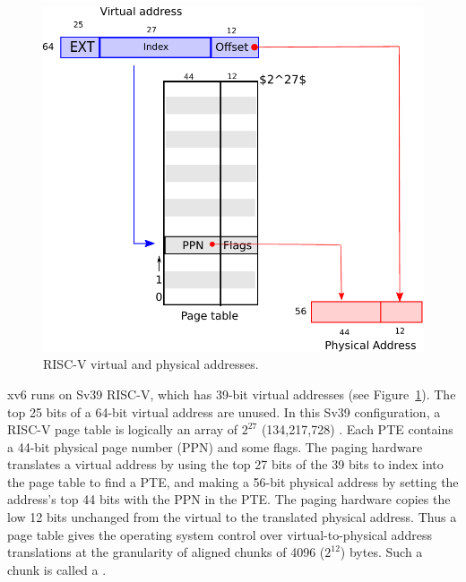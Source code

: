\begin{figure}[t]
\center
\includegraphics[scale=0.5]{fig/riscv_address.pdf}
\caption{RISC-V virtual and physical addresses.}
\label{fig:riscv_address}
\end{figure}

xv6 runs on Sv39 RISC-V, which has 39-bit virtual
addresses (see Figure~\ref{fig:riscv_address}). The top 25 bits of a
64-bit virtual address are unused.  In this Sv39 configuration, a
RISC-V page table is logically an array of $2^{27}$ (134,217,728)
.  Each PTE contains a 44-bit
physical page number (PPN) and some flags. The paging hardware
translates a virtual address by using the top 27 bits of the 39 bits
to index into the page table to find a PTE, and making a 56-bit
physical address by setting the address's top 44 bits with the PPN in
the PTE.  The paging hardware copies the low 12 bits unchanged from
the virtual to the translated physical address.  Thus a page table
gives the operating system control over virtual-to-physical address
translations at the granularity of aligned chunks of 4096 ($2^{12}$)
bytes.  Such a chunk is called a .

